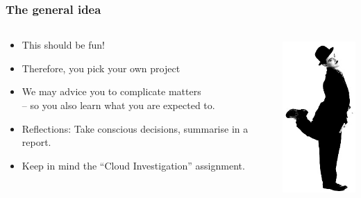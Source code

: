 \documentclass[10pt]{beamer}
\begin{document}
\begin{frame}[t]
\frametitle{The general idea}

\begin{columns}
\begin{column}{9cm}
\begin{itemize}
\item This should be fun!
\item Therefore, you pick your own project
\item We may advice you to complicate matters\\
  -- so you also learn what you are expected to.
\item Reflections: Take conscious decisions, summarise in a report.
\item Keep in mind the ``Cloud Investigation'' assignment.
\end{itemize}
\end{column}
\begin{column}{3cm}
\includegraphics[height=6cm]{Chaplin_Fakeit.jpg}
\end{column}
\end{columns}
\end{frame}




%    
%    

%     

\end{document}
